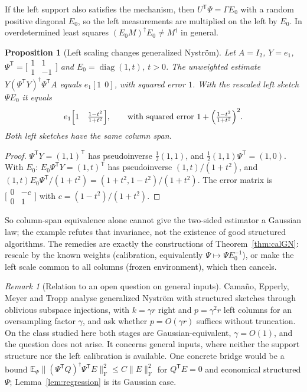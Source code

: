 \documentclass[11pt,a4paper]{article}
\newtheorem{proposition}[theorem]{Proposition}
\theoremstyle{definition}
\theoremstyle{remark}
\newtheorem{remark}[theorem]{Remark}
\numberwithin{equation}{section}
\newcommand{\E}{\mathbb E}
\newcommand{\T}{{\mathsf T}}
\newcommand{\diag}{\operatorname{diag}}
\newcommand{\norm}[1]{\lVert#1\rVert}
\newcommand{\F}{\mathrm F}
\begin{document}
If the left support also satisfies the mechanism, then
$U^\T\Psi=\Gamma E_0$ with a random positive diagonal $E_0$, so the left
measurements are multiplied on the left by $E_0$. In overdetermined least
squares $(E_0M)^\dagger E_0\ne M^\dagger$ in general.

\begin{proposition}[Left scaling changes generalized Nystr\"om]
\label{prop:leftscaling}
Let $A=I_2$, $Y=e_1$, $\Psi^\T=\bigl[\begin{smallmatrix}1&1\\1&-1\end{smallmatrix}\bigr]$
and $E_0=\diag(1,t)$, $t>0$. The unweighted estimate
$Y(\Psi^\T Y)^\dagger\Psi^\T A$ equals $e_1[1\ \ 0]$, with squared error $1$. With
the rescaled left sketch $\Psi E_0$ it equals
\[
 e_1\Bigl[1\ \ \ \tfrac{1-t^2}{1+t^2}\Bigr],\qquad\text{with squared error }
 1+\Bigl(\tfrac{1-t^2}{1+t^2}\Bigr)^2 .
\]
Both left sketches have the same column span.
\end{proposition}

\begin{proof}
$\Psi^\T Y=(1,1)^\T$ has pseudoinverse $\frac12(1,1)$, and
$\frac12(1,1)\Psi^\T=(1,0)$. With $E_0$: $E_0\Psi^\T Y=(1,t)^\T$ has pseudoinverse
$(1,t)/(1+t^2)$, and $(1,t)E_0\Psi^\T/(1+t^2)=(1+t^2,1-t^2)/(1+t^2)$. The error
matrix is $\bigl[\begin{smallmatrix}0&-c\\0&1\end{smallmatrix}\bigr]$ with
$c=(1-t^2)/(1+t^2)$.
\end{proof}

So column-span equivalence alone cannot give the two-sided estimator a Gaussian
law; the example refutes that invariance, not the existence of good structured
algorithms. The remedies are exactly the constructions of
Theorem~\ref{thm:calGN}: rescale by the known weights (calibration,
equivalently $\Psi\mapsto\Psi E_0^{-1}$), or make the left scale common to all
columns (frozen environment), which then cancels.

\begin{remark}[Relation to an open question on general inputs]
Cama\~no, Epperly, Meyer and Tropp \cite[Remark~2.9]{CEMT} analyse
generalized Nystr\"om with structured sketches through oblivious subspace
injections, with $k=\gamma r$ right and $p=\gamma^2r$ left columns for an
oversampling factor $\gamma$, and ask whether $p=O(\gamma r)$ suffices without
truncation. On the class studied here both stages are Gaussian-equivalent,
$\gamma=O(1)$, and the question does not arise. It concerns general inputs,
where neither the support structure nor the left calibration is available.
One concrete bridge would be a bound
$\E_\Psi\norm{(\Psi^\T Q)^\dagger\Psi^\T E}_\F^2\le C\norm E_\F^2$ for
$Q^\T E=0$ and economical structured $\Psi$; Lemma~\ref{lem:regression} is its
Gaussian case.
\end{remark}
\end{document}
